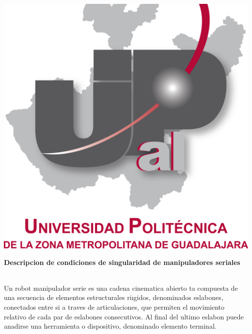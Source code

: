 \documentclass[10pt,a4paper]{article}
\begin{document}
\begin{center}
\includegraphics[scale=0.2]{imagenes/upzmg.png} 
\end{center}
\large \huge\textbf{  Descripcion de condiciones de singularidad de manipuladores seriales  }\\ \\\begin{large}

\end{large}
\large \begin{Large}
Un robot manipulador serie es una cadena cinematica abierto
ta compuesta de una secuencia de elementos estructurales riıgidos, denominados eslabones, conectados entre si a traves de articulaciones, que permiten el movimiento relativo de cada par
de eslabones consecutivos. Al final del ultimo eslabon puede anadirse una herramienta o dispositivo, denominado elemento terminal.

\end{Large}
\end{document}
